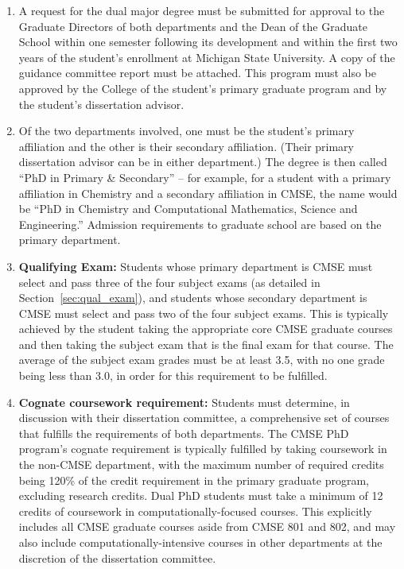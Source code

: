 \begin{enumerate}

\item  A request for the dual major degree must be submitted for
  approval to the Graduate Directors of both departments and the Dean
  of the Graduate School within one semester following its development
  and within the first two years of the student’s enrollment at
  Michigan State University.  A copy of the guidance committee report
  must be attached.  This program must also be approved by the College
  of the student's primary graduate program and by the student's
  dissertation advisor.

\item Of the two departments involved, one must be the student's
  primary affiliation and the other is their secondary affiliation.
  (Their primary dissertation advisor can be in either department.)  The
  degree is then called ``PhD in Primary \& Secondary'' -- for
  example, for a student with a primary affiliation in Chemistry and a
  secondary affiliation in CMSE, the name would be ``PhD in Chemistry
  and Computational Mathematics, Science and Engineering.'' Admission
  requirements to graduate school are based on the primary department.

\item \textbf{Qualifying Exam:} Students whose primary department is
  CMSE must select and pass three of the four subject exams (as
  detailed in Section~\ref{sec:qual_exam}), and students whose
  secondary department is CMSE must select and pass two of the four
  subject exams.  This is typically achieved by the student taking the
  appropriate core CMSE graduate courses and then taking the subject
  exam that is the final exam for that course.  The average of the
  subject exam grades must be at least 3.5, with no one grade being
  less than 3.0, in order for this requirement to be fulfilled. 

\item \textbf{Cognate coursework requirement:}  Students must
  determine, in discussion with their dissertation committee, a
  comprehensive set of courses that fulfills the requirements of both
  departments.  The CMSE PhD program's cognate requirement is
  typically fulfilled by taking coursework in the non-CMSE department,
  with the maximum number of required credits being 120\% of the
  credit requirement in the primary graduate program, excluding
  research credits.  Dual PhD students
  must take a minimum of 12 credits of coursework in
  computationally-focused courses.  This explicitly includes all CMSE
  graduate courses aside from CMSE 801 and 802, and may also include
  computationally-intensive courses in other departments at the
  discretion of the dissertation committee.


\end{enumerate}
